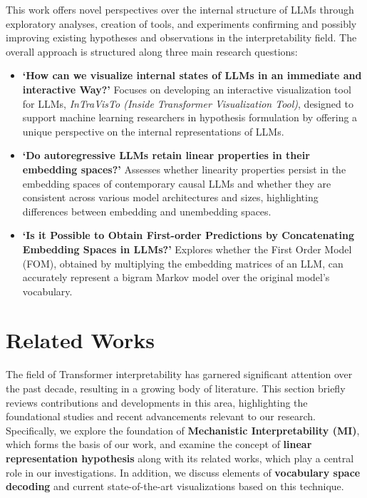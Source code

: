 \documentclass[11pt,a4paper,twocolumn]{article}
\begin{document}
This work offers novel perspectives over the internal structure of LLMs through exploratory analyses, creation of tools, and experiments confirming and possibly improving existing hypotheses and observations in the interpretability field.
The overall approach is structured along three main research questions: 
\begin{itemize}[leftmargin=12pt]
    \item \textbf{`How can we visualize internal states of LLMs in an immediate and interactive Way?'} Focuses on developing an interactive visualization tool for LLMs, \emph{InTraVisTo (Inside Transformer Visualization Tool)}, designed to support machine learning researchers in hypothesis formulation by offering a unique perspective on the internal representations of LLMs.
    \item \textbf{`Do autoregressive LLMs retain linear properties in their embedding spaces?'} Assesses whether linearity properties persist in the embedding spaces of contemporary causal LLMs and whether they are consistent across various model architectures and sizes, highlighting differences between embedding and unembedding spaces.
    \item \textbf{`Is it Possible to Obtain First-order Predictions by Concatenating Embedding Spaces in LLMs?'} Explores whether the First Order Model (FOM), obtained by multiplying the embedding matrices of an LLM, can accurately represent a bigram Markov model over the original model's vocabulary.
\end{itemize}

\section{Related Works}\label{sec:related_works}
The field of Transformer interpretability has garnered significant attention over the past decade, resulting in a growing body of literature.
This section briefly reviews contributions and developments in this area, highlighting the foundational studies and recent advancements relevant to our research.
Specifically, we explore the foundation of \textbf{Mechanistic Interpretability (MI)}, which forms the basis of our work, and examine the concept of \textbf{linear representation hypothesis} along with its related works, which play a central role in our investigations.
In addition, we discuss elements of \textbf{vocabulary space decoding} and current state-of-the-art visualizations based on this technique.
\end{document}
